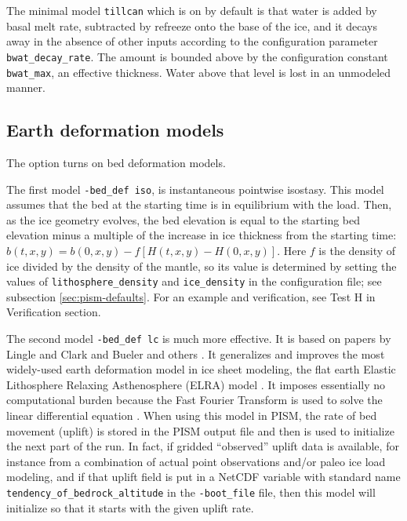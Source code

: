 The minimal model \verb|tillcan| which is on by default is that water is added by basal melt rate, subtracted by refreeze onto the base of the ice, and it decays away in the absence of other inputs according to the configuration parameter \texttt{bwat_decay_rate}.  The amount is bounded above by the configuration constant \texttt{bwat_max}, an effective thickness.  Water above that level is lost in an unmodeled manner.

\subsection{Earth deformation models} \label{subsect:beddef}  

The option  turns on bed deformation models.

The first model \verb|-bed_def iso|, is instantaneous pointwise isostasy.  This model assumes that the bed at the starting time is in equilibrium with the load.  Then, as the ice geometry evolves, the bed elevation is equal to the starting bed elevation minus a multiple of the increase in ice thickness from the starting time: $b(t,x,y) = b(0,x,y) - f [H(t,x,y) - H(0,x,y)]$.  Here $f$ is the density of ice divided by the density of the mantle, so its value is determined by setting the values of \verb|lithosphere_density| and \verb|ice_density| in the configuration file; see subsection \ref{sec:pism-defaults}.  For an example and verification, see Test H in Verification section. 

The second model \verb|-bed_def lc| is much more effective.  It is based on papers by Lingle and Clark \cite{LingleClark}  and Bueler and others \cite{BLKfastearth}.  It generalizes and improves the most widely-used earth deformation model in ice sheet modeling, the flat earth Elastic Lithosphere Relaxing Asthenosphere (ELRA) model \cite{Greve2001}.  It imposes  essentially no computational burden because the Fast Fourier Transform is used to solve the linear differential equation \cite{BLKfastearth}.  When using this model in PISM, the rate of bed movement (uplift) is stored in the PISM output file and then is used to initialize the next part of the run.  In fact, if gridded ``observed'' uplift data is available, for instance from a combination of actual point observations and/or paleo ice load modeling, and if that uplift field is put in a NetCDF variable with standard name \verb|tendency_of_bedrock_altitude| in the  \texttt{-boot_file} file, then this model will initialize so that it starts with the given uplift rate.

